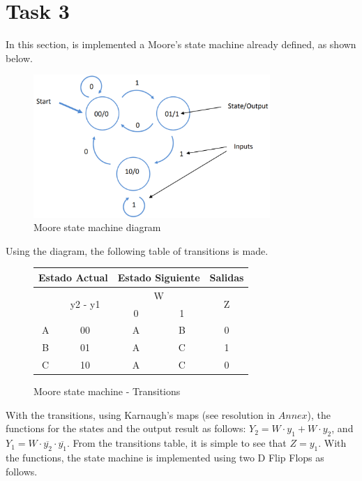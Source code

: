 


\section*{Task 3}

In this section, is implemented a Moore's state
machine already defined, as shown below.

\begin{figure}[H]
    \begin{centering}
    \includegraphics[width=0.8\textwidth]{Graficos3/3a_fsm.png}
    \par\end{centering}
    \caption{Moore state machine diagram}
\end{figure}

Using the diagram, the following table of transitions 
is made.

\begin{figure}[H]
\begin{center}
\begin{tabular}{|c|c|c|c||c|}
    \hline 
    \multicolumn{2}{|c|}{Estado Actual} & \multicolumn{2}{c||}{Estado Siguiente} & \multicolumn{1}{c|}{Salidas}\tabularnewline
    \hline 
    \hline 
    \multirow{2}{*}{} & \multirow{2}{*}{y2 - y1} & \multicolumn{2}{c||}{W} & \multirow{2}{*}{Z}\tabularnewline
    \cline{3-4} 
     &  & \multicolumn{1}{c|}{0} & \multicolumn{1}{c||}{1} & \tabularnewline
    \hline 
    A & 00 & A & B & 0\tabularnewline
    \hline 
    B & 01 & A & C & 1\tabularnewline
    \hline 
    C & 10 & A & C & 0\tabularnewline
    \hline 
    \end{tabular}
    \caption{Moore state machine - Transitions}
\end{center}
\end{figure}
With the transitions, using Karnaugh's maps (see resolution in $Annex$), the 
functions for the states and the output result as follows: $Y_2 = W \cdot y_1 + W \cdot y_2$, and $Y_1 = W \cdot \overline{y_2} \cdot \overline{y_1}$. 
\newpage
From the transitions table, it is simple to see that $Z = y_1$.
With the functions, the state machine is implemented 
using two D Flip Flops as follows. 

